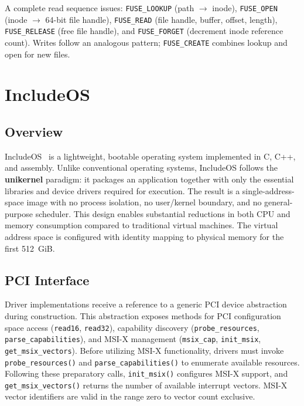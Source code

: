 \documentclass[12pt, a4paper, oneside]{report}
\begin{document}
A complete read sequence issues: \texttt{FUSE\_LOOKUP} (path $\to$ inode),
\texttt{FUSE\_OPEN} (inode $\to$ 64-bit file handle), \texttt{FUSE\_READ}
(file handle, buffer, offset, length), \texttt{FUSE\_RELEASE} (free file
handle), and \texttt{FUSE\_FORGET} (decrement inode reference count).  Writes
follow an analogous pattern; \texttt{FUSE\_CREATE} combines lookup and open for
new files.

\section{IncludeOS}
\label{sec:includeos}

\subsection{Overview}

IncludeOS~\cite{bratterud2015} is a lightweight, bootable operating system
implemented in C, C++, and assembly.  Unlike conventional operating systems,
IncludeOS follows the \textbf{unikernel} paradigm: it packages an application
together with only the essential libraries and device drivers required for
execution.  The result is a single-address-space image with no process isolation,
no user/kernel boundary, and no general-purpose scheduler.  This design enables
substantial reductions in both CPU and memory consumption compared to traditional
virtual machines.  The virtual address space is configured with identity mapping
to physical memory for the first 512~GiB.

\subsection{PCI Interface}

Driver implementations receive a reference to a generic PCI device abstraction
during construction.  This abstraction exposes methods for PCI configuration
space access (\texttt{read16}, \texttt{read32}), capability discovery
(\texttt{probe\_resources}, \texttt{parse\_capabilities}), and MSI-X management
(\texttt{msix\_cap}, \texttt{init\_msix}, \texttt{get\_msix\_vectors}).  Before
utilizing MSI-X functionality, drivers must invoke \texttt{probe\_resources()}
and \texttt{parse\_capabilities()} to enumerate available resources.  Following
these preparatory calls, \texttt{init\_msix()} configures MSI-X support, and
\texttt{get\_msix\_vectors()} returns the number of available interrupt vectors.
MSI-X vector identifiers are valid in the range zero to vector count exclusive.
\end{document}
